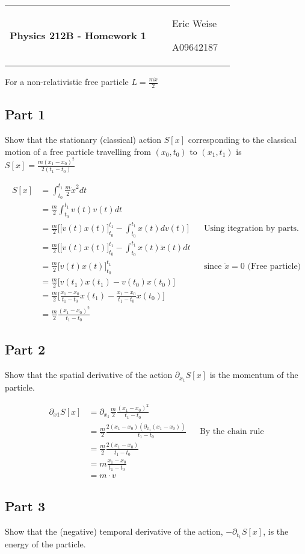 \documentclass{article}
\newcommand{\assignment}[1]{
    \newpage
    \begin{tabular}{p{0.65\linewidth}p{0.25\linewidth}}
        {\bf\LARGE Physics 212B - Homework #1 }
        &
        \parbox[b]{0.24\textwidth}{
            \hfill Eric Weise

            \hfill A09642187
            }
    \end{tabular}
    \vspace{12pt}
    \newline
}
\begin{document}
\assignment{1}
For a non-relativistic free particle \( L = \frac{m\dot{x}}{2} \)
\subsection*{Part 1}
Show that the stationary (classical) action $S[x]$ corresponding to the
classical motion of a free particle travelling from $(x_0,t_0)$ to
$(x_1,t_1)$ is \( S[x]= \frac{m(x_1-x_0)^2}{2(t_1-t_0)}\)

\begin{align*}
    S[x]
    &= \int_{t_0}^{t_1} \frac{m}{2}\dot{x}^2 dt \\
    &= \frac{m}{2} \int_{t_0}^{t_1} v(t) v(t) dt \\
    &= \frac{m}{2} \Big[ \big[ v(t) x(t) \big]_{t_0}^{t_1} - \int_{t_0}^{t_1} x(t) dv(t) \Big]
        && \text{Using itegration by parts.} \\
    &= \frac{m}{2} \Big[ \big[ v(t) x(t) \big]_{t_0}^{t_1} - \int_{t_0}^{t_1} x(t) \ddot{x}(t) dt \\
    &= \frac{m}{2} \big[ v(t) x(t) \big]_{t_0}^{t_1}
        && \text{since $\ddot{x}=0$ (Free particle)} \\
    &= \frac{m}{2} \big[ v(t_1) x(t_1) - v(t_0) x(t_0) \big] \\
    &= \frac{m}{2} \big[ \frac{x_1 - x_0}{t_1 - t_0} x(t_1) - \frac{x_1 - x_0}{t_1 - t_0} x(t_0) \big] \\
    &= \frac{m}{2} \frac{(x_1 - x_0)^2}{t_1 - t_0}
\end{align*}

\subsection*{Part 2}
Show that the spatial derivative of the action \( \partial_{x_1} S[x] \) is the momentum of the particle.

\begin{align*}
    \partial_{x1} S[x]
    &= \partial_{x_1} \frac{m}{2} \frac{(x_1 - x_0)^2}{t_1 - t_0} \\
    &= \frac{m}{2} \frac{2(x_1 - x_0)(\partial_{x_1}(x_1 - x_0))}{t_1 - t_0}
        && \text{By the chain rule} \\
    &= \frac{m}{2} \frac{2(x_1 - x_0)}{t_1 - t_0} \\
    &= m \frac{x_1 - x_0}{t_1 - t_0} \\
    &= m \cdot v
\end{align*}

\subsection*{Part 3}
Show that the (negative) temporal derivative of the action, \( -\partial_{t_1} S[x] \), is the energy of the particle.
\end{document}
